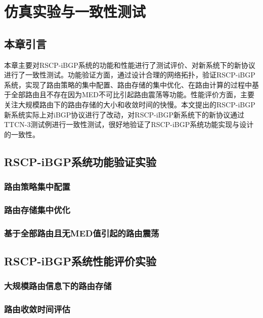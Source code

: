 \chapter{仿真实验与一致性测试}
\label{cha:evaluate}


\section{本章引言}
本章主要对RSCP-iBGP系统的功能和性能进行了测试评价、对新系统下的新协议进行了一致性测试。功能验证方面，通过设计合理的网络拓扑，验证RSCP-iBGP系统，实现了路由策略的集中配置、路由存储的集中优化、在路由计算的过程中基于全部路由且不存在因为MED不可比引起路由震荡等功能。性能评价方面，主要关注大规模路由下的路由存储的大小和收敛时间的快慢。本文提出的RSCP-iBGP新系统实际上对iBGP协议进行了改动，对RSCP-iBGP新系统下的新协议通过TTCN-3测试例进行一致性测试，很好地验证了RSCP-iBGP系统功能实现与设计的一致性。

\section{RSCP-iBGP系统功能验证实验}

\subsection{路由策略集中配置}

\subsection{路由存储集中优化}

\subsection{基于全部路由且无MED值引起的路由震荡}


\section{RSCP-iBGP系统性能评价实验}

\subsection{大规模路由信息下的路由存储}

\subsection{路由收敛时间评估}


